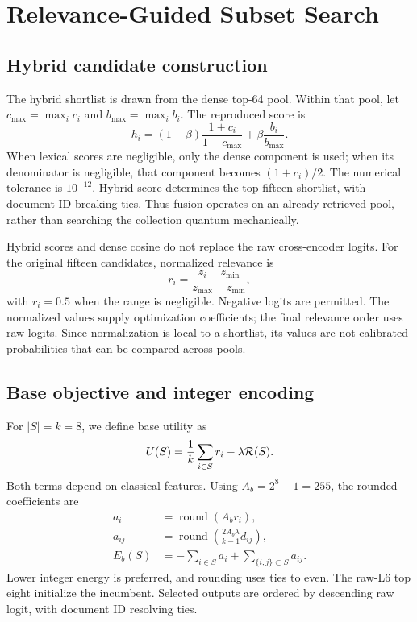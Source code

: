 \section{Relevance-Guided Subset Search}\label{sec:method}
\subsection{Hybrid candidate construction}
The hybrid shortlist is drawn from the dense top-64 pool. Within that pool, let $c_{\max}=\max_i c_i$ and $b_{\max}=\max_i b_i$. The reproduced score is
\begin{equation}
h_i=(1-\beta)\frac{1+c_i}{1+c_{\max}}+\beta\frac{b_i}{b_{\max}}.
\label{eq:hybrid}
\end{equation}
When lexical scores are negligible, only the dense component is used; when its denominator is negligible, that component becomes $(1+c_i)/2$. The numerical tolerance is $10^{-12}$. Hybrid score determines the top-fifteen shortlist, with document ID breaking ties. Thus fusion operates on an already retrieved pool, rather than searching the collection quantum mechanically.

Hybrid scores and dense cosine do not replace the raw cross-encoder logits. For the original fifteen candidates, normalized relevance is
\begin{equation}
r_i=\frac{z_i-z_{\min}}{z_{\max}-z_{\min}},
\label{eq:normalized_relevance}
\end{equation}
with $r_i=0.5$ when the range is negligible. Negative logits are permitted. The normalized values supply optimization coefficients; the final relevance order uses raw logits. Since normalization is local to a shortlist, its values are not calibrated probabilities that can be compared across pools.

\subsection{Base objective and integer encoding}
For $|S|=k=8$, we define base utility as
\begin{equation}
U(S)=\frac{1}{k}\sum_{i\in S}r_i-\lambda\mathcal{R}(S).
\label{eq:base_utility}
\end{equation}
Both terms depend on classical features. Using $A_b=2^8-1=255$, the rounded coefficients are
\begin{align}
a_i&=\operatorname{round}(A_b r_i),\\
a_{ij}&=\operatorname{round}\!\left(\frac{2A_b\lambda}{k-1}d_{ij}\right),\\
E_b(S)&=-\sum_{i\in S}a_i+\sum_{\{i,j\}\subset S}a_{ij}.
\label{eq:base_energy}
\end{align}
Lower integer energy is preferred, and rounding uses ties to even. The raw-L6 top eight initialize the incumbent. Selected outputs are ordered by descending raw logit, with document ID resolving ties.

